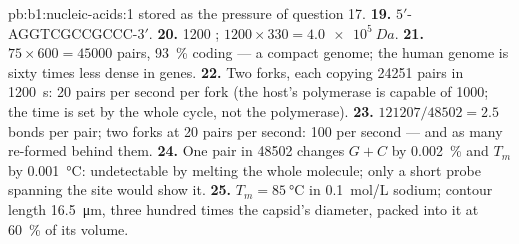 \begin{solution}{pb:b1:nucleic-acids:1}
stored as the pressure of question 17.
\textbf{19.} $5'$-AGGTCGCCGCCC-$3'$.
\textbf{20.} \num{1200} ; $1200\times 330 = \qty{4.0e5}{Da}$.
\textbf{21.} $75\times 600 = \num{45000}$ pairs, \qty{93}{\%} coding
--- a compact genome; the human genome is sixty times less dense in
genes.
\textbf{22.} Two forks, each copying \num{24251} pairs in \qty{1200}{s}:
\qty{20}{} pairs per second per fork (the host's polymerase is capable
of \qty{1000}{}; the time is set by the whole cycle, not the
polymerase).
\textbf{23.} $\num{121207}/\num{48502} = 2.5$ bonds per pair; two forks at 20 pairs per second: 100  per second --- and as many re-formed behind them.
\textbf{24.} One pair in \num{48502} changes $G + C$ by
\qty{0.002}{\%} and $T_m$ by \qty{0.001}{\celsius}: undetectable by
melting the whole molecule; only a short probe spanning the site would
show it.
\textbf{25.} $T_m = \qty{85}{\celsius}$ in \qty{0.1}{mol/L} sodium;
contour length \qty{16.5}{\micro m}, three hundred times the capsid's
diameter, packed into it at \qty{60}{\%} of its volume.
\end{solution}
